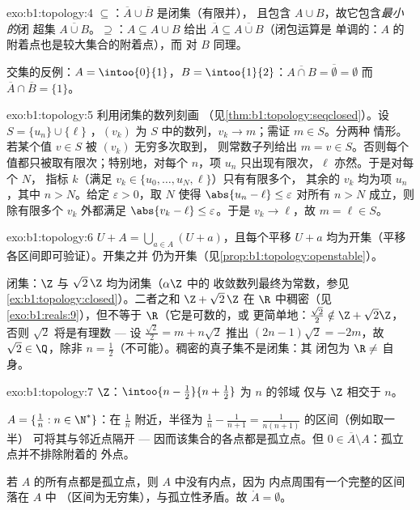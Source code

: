 \begin{solution}{exo:b1:topology:4}
$\subseteq$：$\overline A \cup \overline B$ 是闭集（有限并），
且包含 $A \cup B$，故它包含\emph{最小的}闭
超集 $\overline{A \cup B}$。$\supseteq$：$A \subseteq A \cup B$
给出 $\overline A \subseteq \overline{A \cup B}$（闭包运算是
单调的：$A$ 的附着点也是较大集合的附着点），而
对 $B$ 同理。

交集的反例：$A = \intoo{0}{1}$，$B =
\intoo{1}{2}$：$\overline{A \cap B} = \overline\emptyset = \emptyset$
而 $\overline A \cap \overline B = \{1\}$。
\end{solution}

\begin{solution}{exo:b1:topology:5}
利用闭集的数列刻画
（见\cref{thm:b1:topology:seqclosed}）。设 $S = \{u_n\} \cup \{\ell\}$
，$(v_k)$ 为 $S$ 中的数列，$v_k \to m$；需证 $m \in S$。分两种
情形。若某个值 $v \in S$ 被 $(v_k)$ 无穷多次取到，
则常数子列给出 $m = v \in S$。否则每个
值都只被取有限次；特别地，对每个 $n$，项 $u_n$
只出现有限次，$\ell$ 亦然。于是对每个 $N$，
指标 $k$（满足 $v_k \in \{u_0, \dots, u_N, \ell\}$）只有有限多个，
其余的 $v_k$ 均为项 $u_n$，其中 $n > N$。给定
$\varepsilon > 0$，取 $N$ 使得 $\abs{u_n - \ell} \leq
\varepsilon$ 对所有 $n > N$ 成立，则除有限多个 $v_k$ 外都满足
$\abs{v_k - \ell} \leq \varepsilon$。于是 $v_k \to \ell$，故 $m =
\ell \in S$。
\end{solution}

\begin{solution}{exo:b1:topology:6}
$U + A = \bigcup_{a \in A} (U + a)$，且每个平移 $U + a$
均为开集（平移各区间即可验证）。开集之并
仍为开集（见\cref{prop:b1:topology:openstable}）。

闭集：$\Z$ 与 $\sqrt 2\,\Z$ 均为闭集（$\alpha\Z$ 中的
收敛数列最终为常数，参见
\cref{ex:b1:topology:closed}）。二者之和 $\Z + \sqrt 2\,\Z$ 在
$\R$ 中稠密（见\cref{exo:b1:reals:9}），但不等于 $\R$（它是可数的，或
更简单地：$\frac{\sqrt 2}{2} \notin \Z + \sqrt2\Z$，否则 $\sqrt 2$
将是有理数 --- 设 $\frac{\sqrt2}{2} = m + n\sqrt 2$
推出 $(2n - 1)\sqrt 2 = -2m$，故 $\sqrt 2 \in \Q$，除非 $n =
\frac12$（不可能）。稠密的真子集不是闭集：其
闭包为 $\R \neq$ 自身。
\end{solution}

\begin{solution}{exo:b1:topology:7}
$\Z$：$\intoo{n - \frac12}{n + \frac12}$ 为 $n$ 的邻域
仅与 $\Z$ 相交于 $n$。

$A = \{\frac1n : n \in \N^*\}$：在 $\frac 1n$ 附近，半径为
$\frac{1}{n} - \frac{1}{n+1} = \frac{1}{n(n+1)}$ 的区间（例如取一半）
可将其与邻近点隔开 --- 因而该集合的各点都是孤立点。但 $0 \in
\overline A \setminus A$：孤立点并不排除附着的
外点。

若 $A$ 的所有点都是孤立点，则 $A$ 中没有内点，因为
内点周围有一个完整的区间落在 $A$ 中
（区间为无穷集），与孤立性矛盾。故 $\mathring A
= \emptyset$。
\end{solution}

